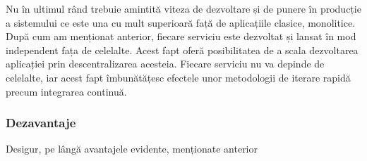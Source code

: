 Nu în ultimul rând trebuie amintită viteza de dezvoltare și de punere în producție a sistemului ce este una cu mult superioară față de aplicațiile clasice, monolitice. După cum am menționat anterior, fiecare serviciu este dezvoltat și lansat în mod independent fața de celelalte. Acest fapt oferă posibilitatea de a scala dezvoltarea aplicației prin descentralizarea acesteia. Fiecare serviciu nu va depinde de celelalte, iar acest fapt îmbunătățesc efectele unor metodologii de iterare rapidă precum integrarea continuă.

\subsubsection{Dezavantaje}

Desigur, pe lângă avantajele evidente, menționate anterior 